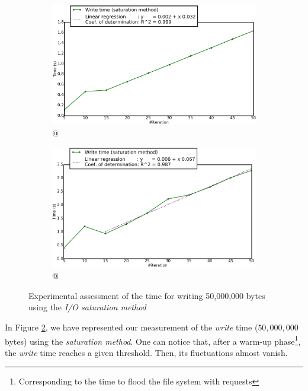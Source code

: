 			\begin{figure}[!h]
				\centering
				\begin{subfigure}[b]{0.475\textwidth}
					\centering
					\includegraphics[width=\textwidth]{charts/writeTimeExample_saturationMethod_workstation_8core.png}
					\caption[\targetPlatformLaptop\space @ \targetPlatformLaptopFrequency]
					{{\small \targetPlatformLaptop\space @ \targetPlatformLaptopFrequency}}
				\end{subfigure}
				\hfill
				\begin{subfigure}[b]{0.475\textwidth}  
					\centering 
					\includegraphics[width=\textwidth]{charts/writeTimeExample_saturationMethod_HPC_jureca.png}
					\caption[]%
					{{\small \targetPlatformHpc\space @ \targetPlatformHpcFrequency}}    
					\label{fig:writeTimeExample_saturation_hpc}
				\end{subfigure}
				\caption{Experimental assessment of the time for writing 50,000,000 bytes using the \emph{I/O saturation method}}
				\label{fig:writeTimeExample_saturation}
			\end{figure}
			In Figure \ref{fig:writeTimeExample_saturation}, we have represented our measurement of the \emph{write} time ($50,000,000$ bytes) using the \emph{saturation method}.   One can notice that, after a warm-up phase\footnote{Corresponding to the time to flood the file system with \notationIO\space requests}, the \emph{write} time reaches a given threshold.   Then, its fluctuations almost vanish.\\

